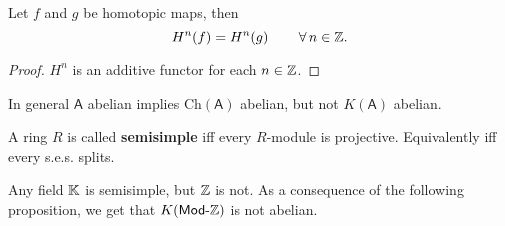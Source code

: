\begin{cor}
	Let $f$ and $g$ be homotopic maps, then
	\begin{equation}
		H^n(f) = H^n(g) \qquad \,\forall\, n \in \mathbb{Z}
	.\end{equation} 
\end{cor} 
\begin{proof}
	$H^n$ is an additive functor for each $n \in \mathbb{Z}$.
\end{proof}

\begin{rem}[]
	In general $\mathsf{A}$ abelian implies $\mathrm{Ch}(\mathsf{A})$ abelian,
	but not $K(\mathsf{A})$ abelian.
\end{rem}

\begin{defn}
	A ring $R$ is called \textbf{semisimple} iff every $R$-module is projective.
	Equivalently iff every s.e.s. splits.
\end{defn}

\begin{ex}
	Any field $\mathbb{K}$ is semisimple, but $\mathbb{Z}$ is not.
	As a consequence of the following proposition, we get that $K(\mathsf{Mod}\text{-}\mathbb{Z})$
	is not abelian.
\end{ex}

